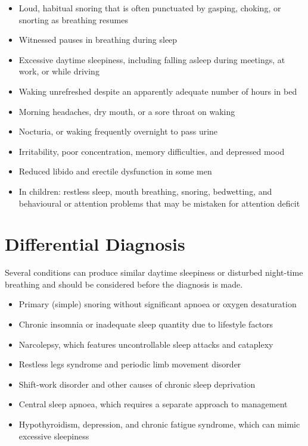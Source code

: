 \begin{itemize}
    \item Loud, habitual snoring that is often punctuated by gasping, choking, or snorting as breathing resumes
    \item Witnessed pauses in breathing during sleep
    \item Excessive daytime sleepiness, including falling asleep during meetings, at work, or while driving
    \item Waking unrefreshed despite an apparently adequate number of hours in bed
    \item Morning headaches, dry mouth, or a sore throat on waking
    \item Nocturia, or waking frequently overnight to pass urine
    \item Irritability, poor concentration, memory difficulties, and depressed mood
    \item Reduced libido and erectile dysfunction in some men
    \item In children: restless sleep, mouth breathing, snoring, bedwetting, and behavioural or attention problems that may be mistaken for attention deficit
\end{itemize}

\section*{Differential Diagnosis}
Several conditions can produce similar daytime sleepiness or disturbed night-time breathing and should be considered before the diagnosis is made.

\begin{itemize}
    \item Primary (simple) snoring without significant apnoea or oxygen desaturation
    \item Chronic insomnia or inadequate sleep quantity due to lifestyle factors
    \item Narcolepsy, which features uncontrollable sleep attacks and cataplexy
    \item Restless legs syndrome and periodic limb movement disorder
    \item Shift-work disorder and other causes of chronic sleep deprivation
    \item Central sleep apnoea, which requires a separate approach to management
    \item Hypothyroidism, depression, and chronic fatigue syndrome, which can mimic excessive sleepiness
\end{itemize}

